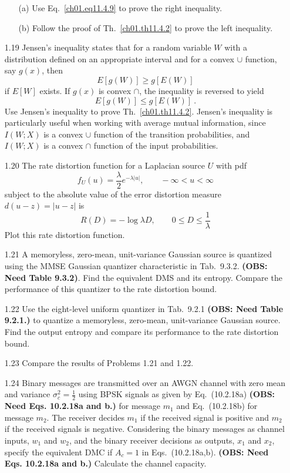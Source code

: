\begin{itemize}
\begin{itemize}
\item[(a)]
Use Eq.~\eqref{ch01.eq11.4.9} to prove the right inequality.

\item[(b)]
Follow the proof of Th.~\ref{ch01.th11.4.2} to prove the left inequality.
\end{itemize}


\item[1.19]
Jensen's inequality states that for a random variable $W$
with a distribution defined on an appropriate interval and for a
convex $\cup$ function, say $g(x)$, then
$$
        E [g (W)] \geq g [ E (W) ]
$$
if $E[W]$ exists.
If $g(x)$  is convex $\cap$, the inequality is reversed to yield
$$
        E [g (W)] \leq g [ E (W) ]~.
$$
Use Jensen's inequality to prove Th.~\ref{ch01.th11.4.2}.
Jensen's inequality is particularly useful when working with average
mutual information, since $I(W; X)$ is a convex $\cup$ function
of the transition probabilities, and $I(W;X)$ is a convex $\cap$
function of the input probabilities.


\item[1.20]
The rate distortion function for a Laplacian source $U$ with pdf
$$
        f_U (u) = \frac{\lambda}{2} e^{- \lambda |u|},
            \qquad  - \infty < u < \infty
$$
subject to the absolute value of the error distortion measure
$d (u-z)= |u -z|$ is
$$
 R(D) = - \log \lambda D,  \qquad 0 \leq D \leq \frac{1}{\lambda}
$$
Plot this rate distortion function.


\item[1.21]
A memoryless, zero-mean, unit-variance Gaussian source is quantized
using the MMSE Gaussian quantizer characteristic in Tab.~9.3.2.
{\bf (OBS: Need Table 9.3.2)}.
Find the equivalent DMS and its entropy.
Compare the performance of this quantizer to the rate distortion bound.


\item[1.22]
Use the eight-level uniform quantizer in Tab.~9.2.1
{\bf (OBS: Need Table 9.2.1.)}
to quantize  a memoryless, zero-mean, unit-variance Gaussian source.
Find the output entropy and compare its performance to the rate distortion
bound.


\item[1.23]
Compare the results of Problems 1.21 and 1.22.


\item[1.24]
Binary messages are transmitted over an AWGN channel with zero mean
and variance $\sigma_c^2 = \tfrac{1}{2}$ using BPSK signals
as given by Eq.~(10.2.18a)
{\bf (OBS: Need Eqs. 10.2.18a and b.)}
for message $m_1$ and Eq.~(10.2.18b) for message $m_2$.
The receiver decides $m_1$ if the received signal is positive
and $m_2$ if the received signals is negative.
Considering the binary messages as channel inputs,
$w_1$ and $w_2$, and the binary receiver decisions as outputs,
$x_1$ and $x_2$, specify the equivalent DMC if
$A_c=1$ in Eqs.~(10.2.18a,b).
{\bf (OBS: Need Eqs. 10.2.18a and b.)}
Calculate the channel capacity.


\end{itemize}
